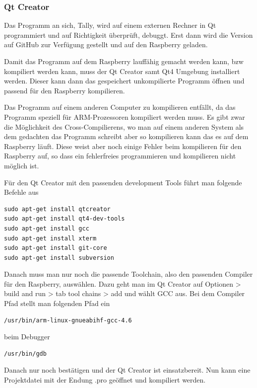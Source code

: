 \documentclass[11pt,a4paper]{article} %
\begin{document}
\subsubsection{Qt Creator}
Das Programm an sich, Tally, wird auf einem externen Rechner in Qt programmiert und auf Richtigkeit überprüft, debuggt. Erst dann wird die Version auf GitHub zur Verfügung gestellt und auf den Raspberry geladen.
\par
Damit das Programm auf dem Raspberry lauffähig gemacht werden kann, bzw kompiliert werden kann, muss der Qt Creator\cite{4} samt Qt4 Umgebung installiert werden. Dieser kann dann das gespeichert unkompilierte Programm öffnen und passend für den Raspberry kompilieren.
\par
Das Programm auf einem anderen Computer zu kompilieren entfällt, da das Programm speziell für ARM-Prozessoren kompiliert werden muss. Es gibt zwar die Möglichkeit des Cross-Compilierens, wo man auf einem anderen System als dem gedachten das Programm schreibt aber so kompilieren kann das es auf dem Raspberry läuft. Diese weist aber noch einige Fehler beim kompilieren für den Raspberry auf, so dass ein fehlerfreies programmieren und kompilieren nicht möglich ist.
\par
Für den Qt Creator mit den passenden development Tools führt man folgende Befehle aus
 \begin{frame}

\begin{lstlisting}
sudo apt-get install qtcreator
sudo apt-get install qt4-dev-tools
sudo apt-get install gcc
sudo apt-get install xterm
sudo apt-get install git-core
sudo apt-get install subversion
\end{lstlisting}

\end{frame}
Danach muss man nur noch die passende Toolchain, also den passenden Compiler für den Raspberry, auswählen. Dazu geht man im Qt Creator auf Optionen > build and run > tab tool chains > add und wählt GCC aus. Bei dem Compiler Pfad stellt man folgenden Pfad ein
\begin{frame}

\begin{lstlisting}
/usr/bin/arm-linux-gnueabihf-gcc-4.6 
\end{lstlisting}

\end{frame} 
beim Debugger
  \begin{frame}

\begin{lstlisting}
/usr/bin/gdb
\end{lstlisting}

\end{frame}
Danach nur noch bestätigen und der Qt Creator ist einsatzbereit. Nun kann eine Projektdatei mit der Endung .pro geöffnet und kompiliert werden.
\par
\end{document}
